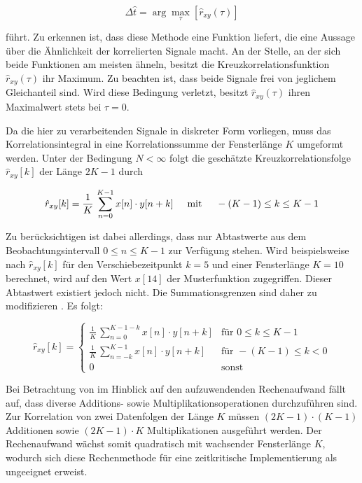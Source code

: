 \begin{equation}\label{eq:kreuzkorrelationMax}
    \Delta \hat t = \arg \max_{\tau} \left[ \hat r_{xy}(\tau) \right ]
\end{equation}

führt. Zu erkennen ist, dass diese Methode eine Funktion liefert, die eine Aussage über die Ähnlichkeit der korrelierten Signale macht. An der Stelle, an der sich beide Funktionen am meisten ähneln, besitzt die Kreuzkorrelationsfunktion $\hat r_{xy}(\tau)$ ihr Maximum. Zu beachten ist, dass beide Signale frei von jeglichem Gleichanteil sind. Wird diese Bedingung verletzt, besitzt $\hat r_{xy}(\tau)$ ihren Maximalwert stets bei $\tau=0$.

Da die hier zu verarbeitenden Signale in diskreter Form vorliegen, muss das Korrelationsintegral in eine Korrelationssumme der Fensterlänge $K$ umgeformt werden. Unter der Bedingung $N<\infty$ folgt die geschätzte Kreuzkorrelationsfolge $\hat r_{xy}[k]$ der Länge $2K-1$ durch

\begin{equation}\label{eq:kreuzkorrelationDiskret}
    \hat r_{xy}[k] = \frac{1}{K} \, \sum_{n=0}^{K-1} x[n] \cdot y[n+k] \hspace{0.5cm} \text{mit} \hspace{0.5cm} -(K-1) \leq k \leq K-1
\end{equation}

Zu berücksichtigen ist dabei allerdings, dass nur Abtastwerte aus dem Beobachtungsintervall $0 \leq n \leq K-1$ zur Verfügung stehen. Wird beispielsweise nach  $\hat r_{xy}[k]$ für den Verschiebezeitpunkt $k=5$ und einer Fensterlänge $K=10$ berechnet, wird auf den Wert $x[14]$ der Musterfunktion zugegriffen. Dieser Abtastwert existiert jedoch nicht. Die Summationsgrenzen sind daher zu modifizieren \cite[S. 321 ff]{Book_SignalProcessing_Kammayer}. Es folgt:

\begin{equation}\label{eq:kreuzkorrelationDiskretMod}
    \hat r_{xy}[k]=\begin{cases}
        \frac{1}{K} \, \sum_{n=0}^{K-1-k} x[n] \cdot y[n+k]  & \text{für } 0 \leq k \leq K-1 \\
      \frac{1}{K} \, \sum_{n=-k}^{K-1} x[n] \cdot y[n+k] & \text{für } -(K-1) \leq k < 0 \\
      0 & \text{sonst}
    \end{cases}
\end{equation}

Bei Betrachtung von  im Hinblick auf den aufzuwendenden Rechenaufwand fällt auf, dass diverse Additions- sowie Multiplikationsoperationen durchzuführen sind. Zur Korrelation von zwei  Datenfolgen der Länge $K$ müssen $(2K-1) \cdot (K-1)$ Additionen sowie $(2K-1) \cdot K$ Multiplikationen ausgeführt werden. Der Rechenaufwand wächst somit quadratisch mit wachsender Fensterlänge $K$, wodurch sich diese Rechenmethode für eine zeitkritische Implementierung als ungeeignet erweist.


